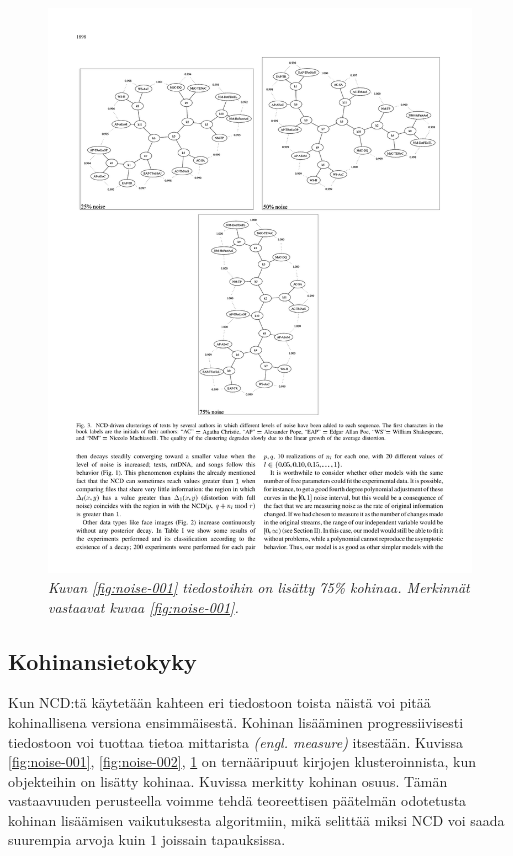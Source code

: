 \documentclass[12pt,finnish]{tktltiki2}
\theoremstyle{definition}
\theoremstyle{remark}
\newcommand{\engl}[1]{\emph{(engl. #1)}}
\begin{document}
    \begin{figure}[tb]
      \immediate{}
      \includegraphics{img/noise-003}
      \caption{\emph{Kuvan \ref{fig:noise-001} tiedostoihin on lisätty 75\% kohinaa. Merkinnät vastaavat kuvaa \ref{fig:noise-001}.}
      \cite{4167725}}
      \label{fig:noise-003}
    \end{figure}
  \subsection{Kohinansietokyky} %
  \label{sub:kohinansietokyky}

    Kun NCD:tä käytetään kahteen eri tiedostoon toista näistä voi pitää kohinallisena versiona ensimmäisestä.
    Kohinan lisääminen progressiivisesti tiedostoon voi tuottaa tietoa mittarista \engl{measure} itsestään.
    Kuvissa \ref{fig:noise-001}, \ref{fig:noise-002}, \ref{fig:noise-003} on ternääripuut kirjojen klusteroinnista, kun objekteihin on lisätty kohinaa. Kuvissa merkitty kohinan osuus.
    Tämän vastaavuuden perusteella voimme tehdä teoreettisen päätelmän odotetusta kohinan lisäämisen vaikutuksesta algoritmiin, mikä selittää miksi NCD voi saada suurempia arvoja kuin $1$ joissain tapauksissa. \cite{4167725}
\end{document}
